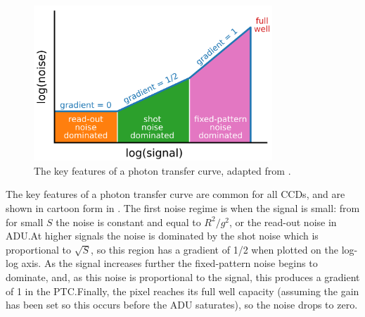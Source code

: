 \begin{colsection}
\begin{colsection}
\begin{figure}[t]
    \begin{center}
        \includegraphics[width=0.8\textwidth]{images/ptc.pdf}
    \end{center}
    \caption[Key features of the photon transfer curve]{
        The key features of a photon transfer curve, adapted from \citet{CCDs}.
    }\label{fig:ptc_cartoon}
\end{figure}

The key features of a photon transfer curve are common for all CCDs, and are shown in cartoon form in . The first noise regime is when the signal is small: from  for small $S$ the noise is constant and equal to $R^2/g^2$, or the read-out noise in ADU.\@ At higher signals the noise is dominated by the shot noise which is proportional to $\sqrt{S}$, so this region has a gradient of 1/2 when plotted on the log-log axis. As the signal increases further the fixed-pattern noise begins to dominate, and, as this noise is proportional to the signal, this produces a gradient of 1 in the PTC.\@ Finally, the pixel reaches its full well capacity (assuming the gain has been set so this occurs before the ADU saturates), so the noise drops to zero.


\end{colsection}
\end{colsection}
